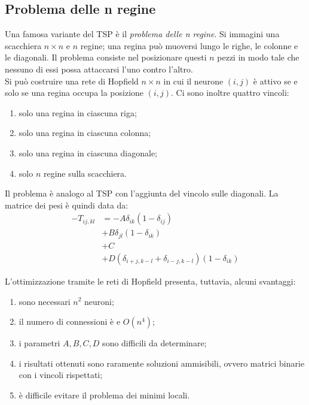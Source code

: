 \subsection{Problema delle n regine} %
\label{sub:problema_delle_n_regine}
Una famosa variante del TSP è il \emph{problema delle n regine}. Si immagini una scacchiera $n \times n$ e $n$ regine; una regina può muoversi lungo le righe, le colonne e le diagonali. Il problema consiste nel posizionare questi $n$ pezzi in modo tale che nessuno di essi possa attaccarsi l'uno contro l'altro.\\

Si può costruire una rete di Hopfield $n \times n$ in cui il neurone $(i,j)$ è attivo se e solo se una regina occupa la posizione $(i,j)$. Ci sono inoltre quattro vincoli:
\begin{enumerate}
	\item solo una regina in ciascuna riga;
	\item solo una regina in ciascuna colonna;
	\item solo una regina in ciascuna diagonale;
	\item solo $n$ regine sulla scacchiera.
\end{enumerate}


\newpage

Il problema è analogo al TSP con l'aggiunta del vincolo sulle diagonali. La matrice dei pesi è quindi data da:
\begin{align*}
	- T_{ij,kl} &= - A \delta_{ik} (1 - \delta_{ij}) \tag{peso inibitorio in ogni riga}\\
	& + B \delta_{jl} (1 - \delta_{ik}) \tag{peso inibitorio in ogni colonna} \\
	& + C  \qquad \tag{Inibizione globale}\\
	& + D (\delta_{i+j,k-l} + \delta_{i-j, k-l})(1 - \delta_{ik}) \tag{peso inibitorio sulle diagonale}
\end{align*}

L'ottimizzazione tramite le reti di Hopfield presenta, tuttavia, alcuni svantaggi:
\begin{enumerate}
	\item sono necessari $n^2$ neuroni;
	\item il numero di connessioni è e $O(n^4)$;
	\item i parametri $A, B, C, D$ sono difficili da determinare;
	\item i risultati ottenuti sono raramente soluzioni ammisibili, ovvero matrici binarie con i vincoli rispettati;
	\item è difficile evitare il problema dei minimi locali.
\end{enumerate}


